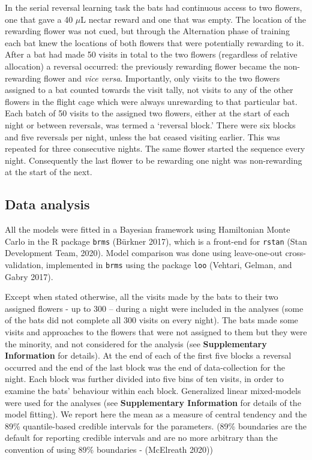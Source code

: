 \documentclass[
]{article}
\begin{document}
In the serial reversal learning task the bats had continuous access to two flowers, one that gave a 40 \(\mu\)L nectar reward and one that was empty. The location of the rewarding flower was not cued, but through the Alternation phase of training each bat knew the locations of both flowers that were potentially rewarding to it. After a bat had made 50 visits in total to the two flowers (regardless of relative allocation) a reversal occurred: the previously rewarding flower became the non-rewarding flower and \emph{vice versa}. Importantly, only visits to the two flowers assigned to a bat counted towards the visit tally, not visits to any of the other flowers in the flight cage which were always unrewarding to that particular bat. Each batch of 50 visits to the assigned two flowers, either at the start of each night or between reversals, was termed a `reversal block.' There were six blocks and five reversals per night, unless the bat ceased visiting earlier. This was repeated for three consecutive nights. The same flower started the sequence every night. Consequently the last flower to be rewarding one night was non-rewarding at the start of the next.

\hypertarget{data-analysis}{%
\subsection{Data analysis}\label{data-analysis}}

All the models were fitted in a Bayesian framework using Hamiltonian Monte Carlo in the R package \texttt{brms} (Bürkner 2017), which is a front-end for \texttt{rstan} (Stan Development Team, 2020). Model comparison was done using leave-one-out cross-validation, implemented in \texttt{brms} using the package \texttt{loo} (Vehtari, Gelman, and Gabry 2017).

Except when stated otherwise, all the visits made by the bats to their two assigned flowers - up to 300 -- during a night were included in the analyses (some of the bats did not complete all 300 visits on every night). The bats made some visits and approaches to the flowers that were not assigned to them but they were the minority, and not considered for the analysis (see \textbf{Supplementary Information} for details). At the end of each of the first five blocks a reversal occurred and the end of the last block was the end of data-collection for the night. Each block was further divided into five bins of ten visits, in order to examine the bats' behaviour within each block. Generalized linear mixed-models were used for the analyses (see \textbf{Supplementary Information} for details of the model fitting). We report here the mean as a measure of central tendency and the 89\% quantile-based credible intervals for the parameters. (89\% boundaries are the default for reporting credible intervals and are no more arbitrary than the convention of using 89\% boundaries - (McElreath 2020))
\end{document}
